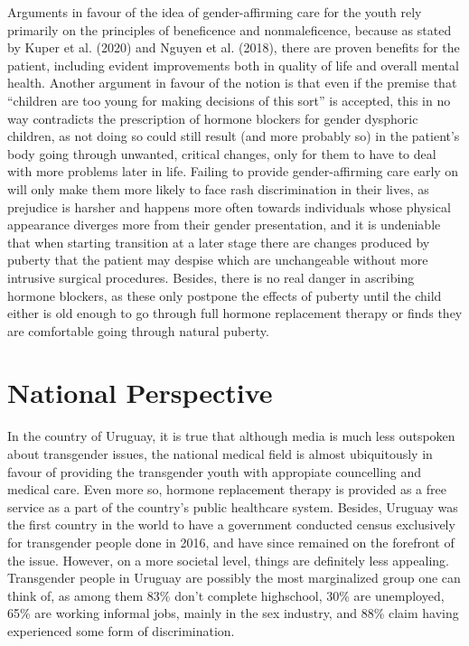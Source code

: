 \documentclass{article}
\begin{document}
Arguments in favour of the idea of gender-affirming care for the youth rely primarily on the principles of beneficence and nonmaleficence, because as stated by Kuper et al. (2020) and Nguyen et al. (2018), there are proven benefits for the patient, including evident improvements both in quality of life and overall mental health. Another argument in favour of the notion is that even if the premise that “children are too young for making decisions of this sort” is accepted, this in no way contradicts the prescription of hormone blockers for gender dysphoric children, as not doing so could still result (and more probably so) in the patient’s body going through unwanted, critical changes, only for them to have to deal with more problems later in life. Failing to provide gender-affirming care early on will only make them more likely to face rash discrimination in their lives, as prejudice is harsher and happens more often towards individuals whose physical appearance diverges more from their gender presentation, and it is undeniable that when starting transition at a later stage there are changes produced by puberty that the patient may despise which are unchangeable without more intrusive surgical procedures. Besides, there is no real danger in ascribing hormone blockers, as these only postpone the effects of puberty until the child either is old enough to go through full hormone replacement therapy or finds they are comfortable going through natural puberty.

\section{National Perspective}

In the country of Uruguay, it is true that although media is much less outspoken about transgender issues, the national medical field is almost ubiquitously in favour of providing the transgender youth with appropiate councelling and medical care. Even more so, hormone replacement therapy is provided as a free service as a part of the country's public healthcare system. Besides, Uruguay was the first country in the world to have a government conducted census exclusively for transgender people done in 2016, and have since remained on the forefront of the issue. However, on a more societal level, things are definitely less appealing. Transgender people in Uruguay are possibly the most marginalized group one can think of, as among them 83\% don’t complete highschool, 30\% are unemployed, 65\% are working informal jobs, mainly in the sex industry, and 88\% claim having experienced some form of discrimination.
\end{document}
